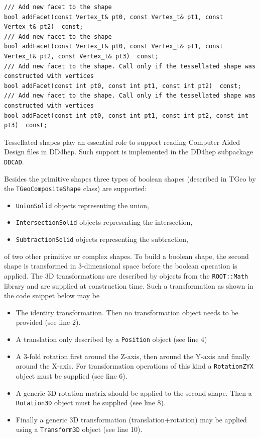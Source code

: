 \begin{itemize}
\begin{verbatim}
/// Add new facet to the shape
bool addFacet(const Vertex_t& pt0, const Vertex_t& pt1, const Vertex_t& pt2)  const;
/// Add new facet to the shape
bool addFacet(const Vertex_t& pt0, const Vertex_t& pt1, const Vertex_t& pt2, const Vertex_t& pt3)  const;
/// Add new facet to the shape. Call only if the tessellated shape was constructed with vertices
bool addFacet(const int pt0, const int pt1, const int pt2)  const;
/// Add new facet to the shape. Call only if the tessellated shape was constructed with vertices
bool addFacet(const int pt0, const int pt1, const int pt2, const int pt3)  const;
\end{verbatim}
Tessellated shapes play an essential role to support reading Computer Aided Design files in DD4hep. Such support is implemented in the DD4hep subpackage \texttt{DDCAD}.

\end{itemize}

Besides the primitive shapes three types of boolean shapes (described in TGeo by the \texttt{TGeoCompositeShape} class) are supported:

\begin{itemize}
\item \texttt{UnionSolid} objects representing the union,
\item \texttt{IntersectionSolid} objects representing the intersection,
\item \texttt{SubtractionSolid} objects representing the subtraction,
\end{itemize}

of two other primitive or complex shapes. To build a boolean shape, the second shape is transformed in 3-dimensional space before the boolean operation is applied. The 3D transformations are described by objects from the \texttt{ROOT::Math} library and are supplied at construction time.  Such a transformation as shown in the code snippet below may be 

\begin{itemize}
\item The identity transformation. Then no transformation object needs to be provided (see line 2).
\item A translation only described by a \texttt{Position} object (see line 4)
\item A 3-fold rotation first around the Z-axis, then around the Y-axis and finally around the X-axis. For transformation operations of this kind a \texttt{RotationZYX} object must be supplied (see line 6).
\item A generic 3D rotation matrix should be applied to the second shape. Then a \texttt{Rotation3D} object must be supplied (see line 8).
\item Finally a generic 3D transformation (translation+rotation) may be applied using a \texttt{Transform3D} object (see line 10).
\end{itemize}

